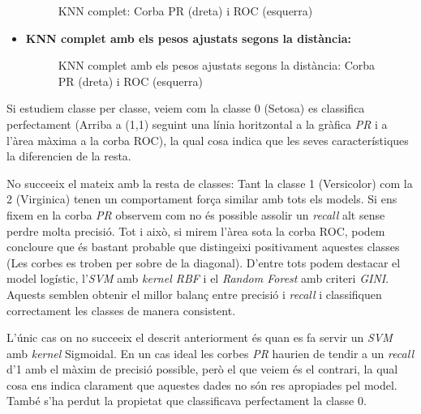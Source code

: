 \documentclass[a4paper, 11pt]{article}
\begin{document}
\begin{itemize}
                \begin{figure}[H]%
                \centering
                \qquad
                \caption*{KNN complet: Corba PR (dreta) i ROC (esquerra)}
                \end{figure}

            \item \textbf{KNN complet amb els pesos ajustats segons la distància:}


                \begin{figure}[H]%
                \centering
                \qquad
                \caption*{KNN complet amb els pesos ajustats segons la distància: Corba PR (dreta) i ROC (esquerra)}
                \end{figure}
        \end{itemize}

        Si estudiem classe per classe, veiem com la classe 0 (Setosa) es classifica perfectament
        (Arriba a (1,1) seguint una línia horitzontal a la gràfica \textit{PR} i a l'àrea màxima a la corba
        ROC), la qual cosa indica que les seves característiques la diferencien de la resta.

        No succeeix el mateix amb la resta de classes: Tant la classe 1 (Versicolor) com la 2
        (Virginica) tenen un comportament força similar amb tots els models. Si ens fixem en la
        corba \textit{PR} observem com no és possible assolir un \textit{recall} alt sense perdre molta
        precisió. Tot i això, si mirem l'àrea sota la corba ROC, podem concloure que és bastant
        probable que distingeixi positivament aquestes classes (Les corbes es troben per sobre de
        la diagonal).
        D'entre tots podem destacar el model logístic, l'\textit{SVM} amb \textit{kernel RBF} i el \textit{Random
        Forest} amb criteri \textit{GINI}. Aquests semblen obtenir el millor balanç entre precisió i
        \textit{recall} i classifiquen correctament les classes de manera consistent.

        L'únic cas on no succeeix el descrit anteriorment és quan es fa servir un \textit{SVM} amb \textit{kernel}
        Sigmoidal. En un cas ideal les corbes \textit{PR} haurien de tendir a un \textit{recall} d'1 amb el
        màxim de precisió possible, però el que veiem és el contrari, la qual cosa ens indica
        clarament que aquestes dades no són res apropiades pel model. També s'ha perdut la propietat
         que classificava perfectament la classe 0.
\end{document}

